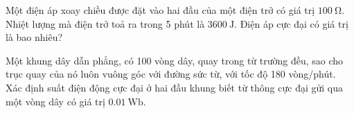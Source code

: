 \begin{ex}
	Một điện áp xoay chiều được đặt vào hai đầu của một điện trở có giá trị $\SI{100}{\ohm}$. Nhiệt lượng mà điện trở toả ra trong 5 phút là $\SI{3600}{\joule}$. Điện áp cực đại có giá trị là bao nhiêu?
\end{ex}
\begin{ex}
	Một khung dây dẫn phẳng, có 100 vòng dây, quay trong từ trường đều, sao cho trục quay của nó luôn vuông góc với đường sức từ, với tốc độ 180 vòng/phút. Xác định suất điện động cực đại ở hai đầu khung biết từ thông cực đại gửi qua một vòng dây có giá trị $\SI{0.01}{\weber}$.
\end{ex}
